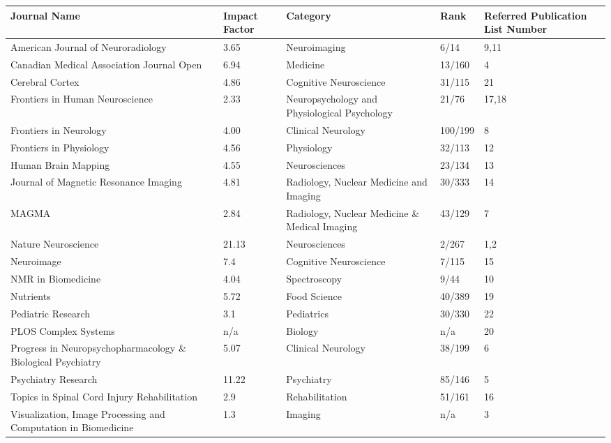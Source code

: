 \documentclass[11pt,notitlepage,english]{report}
\begin{document}
\newcommand{\ifajnr}{3.65}
\newcommand{\ifcmajo}{6.94}
\newcommand{\ifcercor}{4.86}
\newcommand{\iffrontneur}{4.00}
\newcommand{\iffronthum}{2.33}
\newcommand{\iffrontphys}{4.56}
\newcommand{\ifhbm}{4.55}
\newcommand{\ifjmri}{4.81}
\newcommand{\ifmagma}{2.84}
\newcommand{\ifnatneur}{21.13}
\newcommand{\ifneurimag}{7.4}
\newcommand{\ifnmr}{4.04}
\newcommand{\ifnutrients}{5.72}
\newcommand{\ifpedres}{3.1}
\newcommand{\ifprog}{5.07}
\newcommand{\ifpsych}{11.22}
\newcommand{\iftopics}{2.9}
\newcommand{\ifvisual}{1.3}
\begin{longtable}{| L{5cm} | L{2cm} | L{3.5cm} | L{2.5cm} | L{2.5cm} |}
  \hline
  \textbf{Journal Name}    & \textbf{Impact Factor} & \textbf{Category} & \textbf{Rank} & \textbf{Referred Publication List Number} \\
  \hline
  American Journal of Neuroradiology & \ifajnr & Neuroimaging & 6/14 & 9,11 \\
  \hline
  Canadian Medical Association Journal Open & \ifcmajo & Medicine & 13/160 & 4 \\
  \hline
  Cerebral Cortex & \ifcercor & Cognitive Neuroscience & 31/115 & 21 \\
  \hline
  Frontiers in Human Neuroscience & \iffronthum & Neuropsychology and Physiological Psychology & 21/76 & 17,18 \\
  \hline
  Frontiers in Neurology & \iffrontneur & Clinical Neurology & 100/199 & 8 \\
  \hline
  Frontiers in Physiology & \iffrontphys & Physiology & 32/113 & 12 \\
  \hline
  Human Brain Mapping & \ifhbm & Neurosciences & 23/134 & 13 \\
  \hline
  Journal of Magnetic Resonance Imaging & \ifjmri & Radiology, Nuclear Medicine and Imaging & 30/333 & 14 \\
  \hline
  MAGMA & \ifmagma & Radiology, Nuclear Medicine \& Medical Imaging & 43/129 & 7 \\
  \hline
  Nature Neuroscience & \ifnatneur & Neurosciences & 2/267 & 1,2 \\
  \hline
  Neuroimage & \ifneurimag & Cognitive Neuroscience & 7/115 & 15 \\
  \hline
  NMR in Biomedicine & \ifnmr & Spectroscopy & 9/44 & 10 \\
  \hline
  Nutrients & \ifnutrients & Food Science & 40/389 & 19\\ 
  \hline
  Pediatric Research & \ifpedres & Pediatrics & 30/330 & 22 \\
  \hline
  PLOS Complex Systems & n/a & Biology & n/a & 20 \\
  \hline
  Progress in Neuropsychopharmacology \& Biological Psychiatry & \ifprog & Clinical Neurology & 38/199 & 6 \\
  \hline
  Psychiatry Research & \ifpsych & Psychiatry & 85/146 & 5 \\
  \hline
  Topics in Spinal Cord Injury Rehabilitation & \iftopics & Rehabilitation & 51/161 & 16 \\
  \hline
  Visualization, Image Processing and Computation in Biomedicine & \ifvisual & Imaging & n/a & 3 \\
  \hline
\end{longtable}
\end{document}
